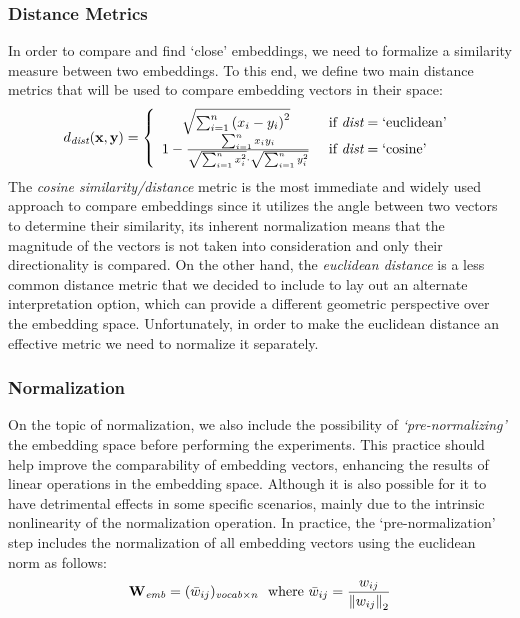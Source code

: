 \subsubsection{Distance Metrics}

In order to compare and find `close' embeddings, we need to formalize a similarity measure between two embeddings. 
To this end, we define two main distance metrics that will be used to compare embedding vectors in their space:
\begin{equation}
    d_{\textit{dist}}(\gbm{x}, \gbm{y}) = 
    \label{eq:method_embeddings_distance}
    \left\{
    \begin{array}{cl}
        \sqrt{\sum_{i=1}^{n}{{(x_i - y_i)}^2}} &\ \text{if}\ \textit{dist} = \text{`euclidean'} \\
        1 - \frac{\sum_{i=1}^{n}{x_i y_i}}{\sqrt{\sum_{i=1}^{n}{x_i^2}} \cdot \sqrt{\sum_{i=1}^{n}{y_i^2}}} &\ \text{if}\ \textit{dist} = \text{`cosine'}
    \end{array}
    \right.
\end{equation}
The \emph{cosine similarity/distance} metric is the most immediate and widely used approach to compare embeddings since it utilizes the angle between two vectors to determine their similarity, its inherent normalization means that the magnitude of the vectors is not taken into consideration and only their directionality is compared.
On the other hand, the \emph{euclidean distance} is a less common distance metric that we decided to include to lay out an alternate interpretation option, which can provide a different geometric perspective over the embedding space.
Unfortunately, in order to make the euclidean distance an effective metric we need to normalize it separately.

\subsubsection{Normalization}

On the topic of normalization, we also include the possibility of \emph{`pre-normalizing'} the embedding space before performing the experiments.
This practice should help improve the comparability of embedding vectors, enhancing the results of linear operations in the embedding space.
Although it is also possible for it to have detrimental effects in some specific scenarios, mainly due to the intrinsic nonlinearity of the normalization operation.
In practice, the `pre-normalization' step includes the normalization of all embedding vectors using the euclidean norm as follows:
\begin{equation}
    \label{eq:method_embeddings_normalization}
    \bm{\mathbf{W}}_{\textit{emb}} = (\bar w_{ij})_{\textit{vocab} \times n}
    \ \ \text{where}\ \bar w_{ij} = \frac{w_{ij}}{{\| w_{ij} \|}_2}
\end{equation}

